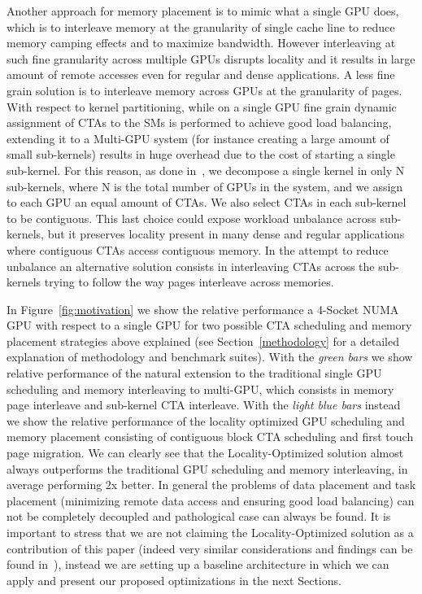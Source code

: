 Another approach for memory placement is to mimic what a single GPU does, 
which is to interleave memory at the granularity of single cache line to 
reduce memory camping effects and to maximize bandwidth. However interleaving 
at such fine granularity across multiple GPUs disrupts locality and it 
results in large amount of remote accesses even for regular and dense 
applications. A less fine grain solution is to interleave memory across GPUs 
at the granularity of pages. With respect to kernel partitioning, while on a 
single GPU fine grain dynamic assignment of CTAs to the SMs is performed to 
achieve good load balancing, extending it to a Multi-GPU system (for instance 
creating a large amount of small sub-kernels) results in huge overhead due to 
the cost of starting a single sub-kernel. For this reason, as done 
in~\cite{Cabezas2015}, we decompose a single kernel in only N sub-kernels, 
where N is the total number of GPUs in the system, and we assign to each GPU 
an equal amount of CTAs. We also select CTAs in each sub-kernel to be 
contiguous. This last choice could expose workload unbalance across 
sub-kernels, but it preserves locality present in many dense and regular 
applications where contiguous CTAs access contiguous memory. In the attempt 
to reduce unbalance an alternative solution consists in interleaving CTAs 
across the sub-kernels trying to follow the way pages interleave across 
memories. 

In Figure~\ref{fig:motivation} we show the relative performance a 4-Socket 
NUMA GPU with respect to a single GPU for two possible CTA scheduling and 
memory placement strategies above explained (see Section~\ref{methodology} 
for a detailed explanation of methodology and benchmark suites). With the 
\emph{green bars} we show relative performance of the natural extension to 
the traditional single GPU scheduling and memory interleaving to 
multi-GPU, which consists in memory page interleave and sub-kernel CTA 
interleave. With the \emph{light blue bars} instead we show the relative 
performance of the locality optimized GPU scheduling and memory placement 
consisting of contiguous block CTA scheduling and first touch page 
migration. We can clearly see that the Locality-Optimized solution almost always 
outperforms the traditional GPU scheduling and memory interleaving, in 
average performing 2x better. In general the problems of data placement and 
task placement (minimizing remote data access and ensuring good load balancing) 
can not be completely decoupled and pathological case can always be found. It 
is important to stress that we are not claiming the Locality-Optimized solution 
as a contribution of this paper (indeed very similar considerations and findings 
can be found in~\cite{Cabezas2015,Arunkumar2017}), instead we are setting up a 
baseline architecture in which we can apply and present our proposed 
optimizations in the next Sections.

